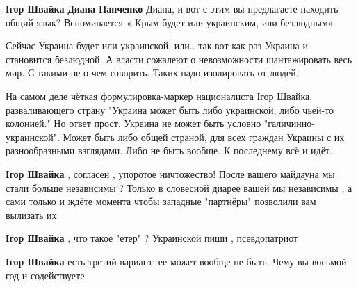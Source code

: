 \begin{itemize}
\begin{itemize}
\textbf{Ігор Швайка} \textbf{Диана Панченко} Диана, и вот с этим вы предлагаете
находить общий язык? Вспоминается « Крым будет или украинским, или безлюдным».

Сейчас Украина будет или украинской, или.. так вот как раз Украина и становится
безлюдной. А власти сожалеют о невозможности шантажировать весь мир. С такими
не о чем говорить. Таких надо изолировать от людей.

 

На самом деле чёткая формулировка-маркер националиста Ігор Швайка,
разваливающего страну "Украина может быть либо украинской, либо чьей-то
колонией." Но ответ прост. Украина не может быть условно
"галичинно-украинской". Может быть либо общей страной, для всех граждан Украины
с их разнообразными взглядами. Либо не быть вообще. К последнему всё и идёт.


 
\textbf{Ігор Швайка} , согласен , упоротое ничтожество! После вашего майдауна
мы стали больше независимы ? Только в словесной диарее вашей мы независимы , а
сами только и ждёте момента чтобы западные "партнёры" позволили вам вылизать их
🤣

 
\textbf{Ігор Швайка} , что такое "етер" ? Украинской пиши , псевдопатриот

 
\textbf{Ігор Швайка} есть третий вариант: ее может вообще не быть. Чему вы восьмой год и содействуете

 

\end{itemize}
\end{itemize}
